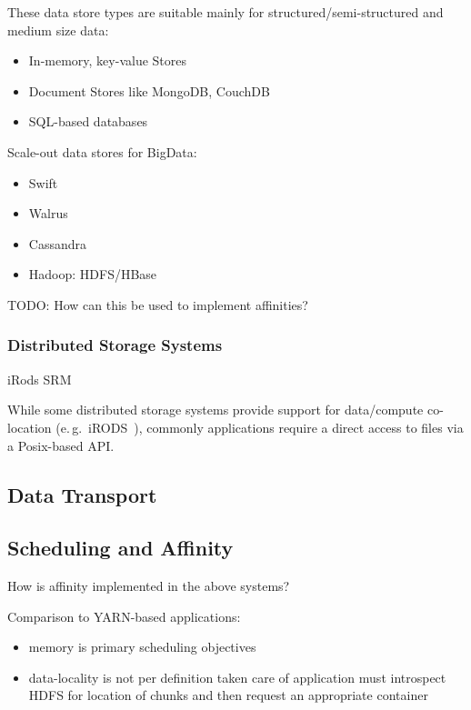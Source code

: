 \documentclass[conference]{IEEEtran}
\begin{document}
These data store types are suitable mainly for structured/semi-structured and 
medium size data:
\begin{itemize}
	\item In-memory, key-value Stores
	\item Document Stores like MongoDB, CouchDB 
	\item SQL-based databases
\end{itemize}

Scale-out data stores for BigData:
\begin{itemize}
	\item Swift
	\item Walrus
	\item Cassandra
	\item Hadoop: HDFS/HBase
\end{itemize}

TODO: How can this be used to implement affinities?


\subsubsection*{Distributed Storage Systems}

iRods
SRM

While some distributed storage systems provide support for data/compute 
co-location (e.\,g.\ iRODS~\cite{Rajasekar:2010:IPI:1855046}), commonly 
applications require a direct access to files via a Posix-based API.

\subsection{Data Transport}

\subsection{Scheduling and Affinity}


How is affinity implemented in the above systems?

Comparison to YARN-based applications:
\begin{itemize}
	\item memory is primary scheduling objectives
	\item data-locality is not per definition taken care of application must 
	introspect HDFS for location of chunks and then request an appropriate 
	container
\end{itemize}

\end{document}
